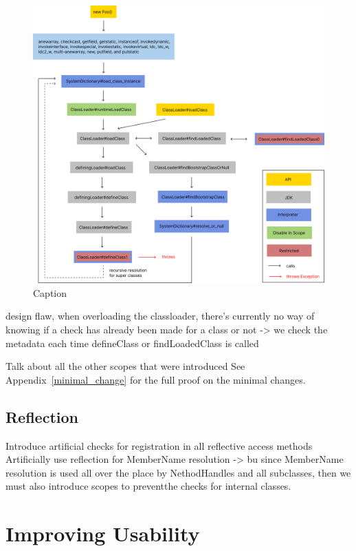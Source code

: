 \begin{figure}
    \centering
    \includegraphics[scale=0.55]{resources/loadClassWithLegend.png}
    \caption{Caption}
    \label{fig:load_class}
\end{figure}


design flaw, when overloading the classloader, there's currently no way of knowing if a check has already been made for a class or not -> we check the metadata each time defineClass or findLoadedClass is called

Talk about all the other scopes that were introduced
See Appendix~\ref{minimal_change} for the full proof on the minimal changes.
\subsection{Reflection}
Introduce artificial checks for registration in all reflective access methods
Artificially use reflection for MemberName resolution -> bu since MemberName resolution is used all over the place by NethodHandles and all subclasses, then we must also introduce scopes to preventthe checks for internal classes.
\section{Improving Usability}

